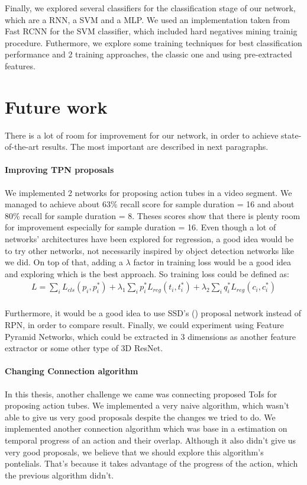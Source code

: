 Finally, we explored several classifiers for the classification stage of our network, which are a RNN, a SVM and a MLP.  We used an implementation taken from Fast RCNN
for the SVM classifier, which included hard negatives mining trainig procedure. Futhermore, we explore some training techniques for best classification performance and
2 training approaches, the classic one and using pre-extracted features. 

\section{Future work}
There is a lot of room for improvement for our network, in order to achieve state-of-the-art results. The most important are described in next paragraphs.

\paragraph{Improving TPN proposals} We implemented 2 networks for proposing action tubes in a video segment. We managed to achieve about 63\% recall score for
sample duration = 16 and about 80\% recall for sample duration = 8. Theses scores show that there is plenty room for improvement especially for sample duration = 16.
Even though a lot of networks' architectures have been explored for regression, a good idea would be to try other networks, not necessarily inspired by object detection
networks like we did. On top of that, adding a $\lambda$ factor in training loss would be a good idea and exploring which is the best approach.
So training loss could be defined as:
\begin{equation} 
\begin{split}
 L  =  \sum_iL_{cls}(p_i, p_i^*) + \lambda_1 \sum_ip_i^*L_{reg}(t_i,t_i^*) + \lambda_2  \sum_iq_i^*L_{reg}(c_{i}, c_{i}^*) \\
\end{split}
\end{equation}

Furthermore, it would be a good idea to use SSD's (\cite{DBLP:journals/corr/LiuAESR15}) proposal network instead of RPN, in order to compare result. Finally,
we could experiment using Feature Pyramid Networks, which could be extracted in 3 dimensions as another feature extractor or some other type of 3D ResNet.

\paragraph{Changing Connection algorithm}
In this thesis, another challenge we came was connecting proposed ToIs for proposing action tubes. We implemented a very naive algorithm, which wasn't
able to give us very good proposals despite the changes we tried to do. We implemented another connection algorithm which was base in a estimation on temporal
progress of an action and their overlap. Although it also didn't give us very good proposals, we believe that we should explore this algorithm's pontelials. That's
because it takes advantage of the progress of the action, which the previous algorithm didn't.

